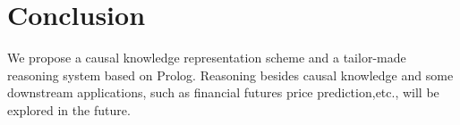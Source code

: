 




\section{Conclusion}
We propose a causal knowledge representation scheme and a tailor-made reasoning system based on Prolog. Reasoning besides causal knowledge and some downstream applications, such as financial futures price prediction,etc., will be explored in the future.